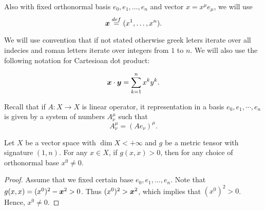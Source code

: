 \documentclass[main.tex]{subfiles}
\begin{document}
Also with fixed orthonormal basis $e_0, e_1, \dots, e_n$ and vector $x = x^\mu e_\mu$, we will use
\begin{equation}
\boldsymbol{x}  \stackrel{def}{=} (x^1, \dots, x^n).
\end{equation}

We will use convention that if not stated otherwise greek leters iterate over all indecies and roman letters iterate over integers from $1$ to $n$. We will also use the following notation for Cartesioan dot product:

\begin{equation}
\boldsymbol{x}\cdot \boldsymbol{y} = \sum_{k=1}^n x^k y^k.
\end{equation}



Recall that if $A: X \to X$ is linear operator, it representation in a basis $e_0, e_1, \cdots, e_n$ is given by a system of numbers $A^\mu_\nu$ such that 
\begin{equation}
A^\mu_\nu = (Ae_\nu)^\mu.
\end{equation}

\begin{lemma}
\label{no-zero-time-if-time-like}
Let $X$ be a vector space with $\dim X < +\infty$ and $g$ be a metric tensor with signature $(1, n)$. For any $x\in X$, if $g(x, x) > 0$, then for any choice of orthonormal base $x^0\not= 0$.
\end{lemma}
\begin{proof}
Assume that we fixed certain base $e_0, e_1, \dots, e_n$. Note that $g(x, x) = (x^0)^2 - \boldsymbol{x}^2 > 0$. Thus $(x^0)^2 > \boldsymbol{x}^2$, which implies that $(x^0)^2 > 0$. Hence, $x^0 \not= 0$. 
\end{proof}
\end{document}
